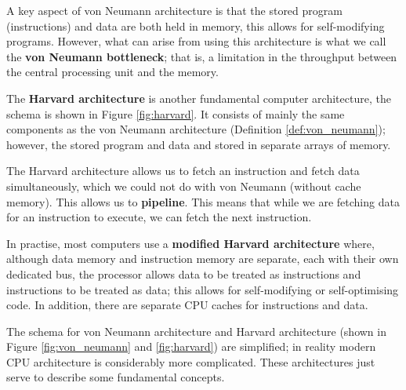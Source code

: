 A key aspect of von Neumann architecture is that the stored program (instructions) and data are both held in memory, this allows for self-modifying programs. However, what can arise from using this architecture is what we call the \textbf{von Neumann bottleneck}; that is, a limitation in the throughput between the central processing unit and the memory.

\begin{definition}
    The \textbf{Harvard architecture} is another fundamental computer architecture, the schema is shown in Figure \ref{fig:harvard}. It consists of mainly the same components as the von Neumann architecture (Definition \ref{def:von_neumann}); however, the stored program and data and stored in separate arrays of memory. 
\end{definition}

The Harvard architecture allows us to fetch an instruction and fetch data simultaneously, which we could not do with von Neumann (without cache memory). This allows us to \textbf{pipeline}. This means that while we are fetching data for an instruction to execute, we can fetch the next instruction.

In practise, most computers use a \textbf{modified Harvard architecture} where, although data memory and instruction memory are separate, each with their own dedicated bus, the processor allows data to be treated as instructions and instructions to be treated as data; this allows for self-modifying or self-optimising code. In addition, there are separate CPU caches for instructions and data.

\begin{remark}
    The schema for von Neumann architecture and Harvard architecture (shown in Figure \ref{fig:von_neumann} and \ref{fig:harvard}) are simplified; in reality modern CPU architecture is considerably more complicated. These architectures just serve to describe some fundamental concepts.
\end{remark}

